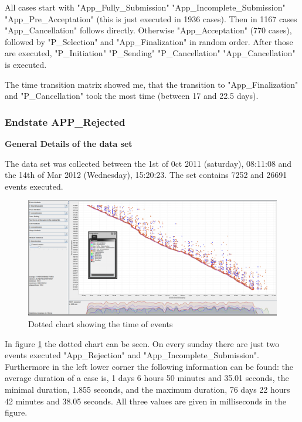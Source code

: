 All cases start with "App\_Fully\_Submission" \textrightarrow "App\_Incomplete\_Submission" \textrightarrow "App\_Pre\_Acceptation" (this is just executed in 1936 cases). Then in 1167 cases "App\_Cancellation" follows directly. Otherwise "App\_Acceptation" (770 cases), followed by "P\_Selection" and "App\_Finalization" in random order. After those are executed, "P\_Initiation" \textrightarrow "P\_Sending" \textrightarrow "P\_Cancellation" \textrightarrow"App\_Cancellation" is executed.

The time transition matrix showed me, that the transition to "App\_Finalization" and "P\_Cancellation" took the most time (between 17 and 22.5 days).


\subsubsection{Endstate APP\_Rejected}

\textbf{General Details of the data set}

The data set was collected between the 1st of 0ct 2011 (saturday), 08:11:08 and the 14th of Mar 2012 (Wednesday), 15:20:23. The set contains 7252 and 26691 events executed. 

\begin{figure}[!htbp]
\centering
\includegraphics[height = 0.2\textheight]{RejDot.PNG}
\caption{Dotted chart showing the time of events}
\label{fig:RejTimeFlow}
\end{figure}

In figure \ref{fig:RejTimeFlow} the dotted chart can be seen. On every sunday there are just two events executed "App\_Rejection" and "App\_Incomplete\_Submission". Furthermore in the left lower corner the following information can be found: the average duration of a case is, 1 days 6 hours 50 minutes and 35.01 seconds, the minimal duration, 1.855 seconds, and the maximum duration, 76 days 22 hours 42 minutes and 38.05 seconds. All three values are given in milliseconds in the figure.

